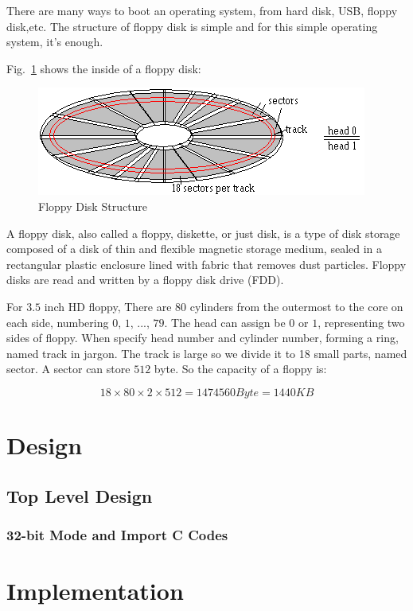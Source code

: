 \documentclass{swfcthesis}
\begin{document}
There are many ways to boot an operating system, from hard disk, USB, floppy disk,etc.
The structure of floppy disk is simple and for this simple operating
system, it's enough.

Fig.~\ref{fig:flpy1.png} shows the inside of a floppy disk:
\begin{figure}[!ht]
  \centering
  \includegraphics[width=.5\textwidth]{../figs/bootLoader/flpy1.png}
  \caption{Floppy Disk Structure}
  \label{fig:flpy1.png}
\end{figure}

A floppy disk, also called a floppy, diskette, or just disk, is a type of disk storage
composed of a disk of thin and flexible magnetic storage medium, sealed in a rectangular
plastic enclosure lined with fabric that removes dust particles. Floppy disks are read and
written by a floppy disk drive (FDD).

For $3.5$ inch HD floppy,  There are $80$ cylinders from the outermost to
the core on each side, numbering $0$, $1$, ..., $79$. The head can assign be $0$ or $1$,
representing two sides of floppy. When specify head number and cylinder number, forming a
ring, named track in jargon. The track is large so we divide it to 18 small parts, named
sector. A sector can store $512$ byte. So the capacity of a floppy is:

$$18 \times 80 \times 2 \times 512 = 1474560 Byte = 1440 KB$$


\chapter{Design}

\section{Top Level Design}
\label{sec:top-level-design}


\subsection{32-bit Mode and Import C Codes}
\label{sec:32-bit-mode}


\chapter{Implementation}
\end{document}
